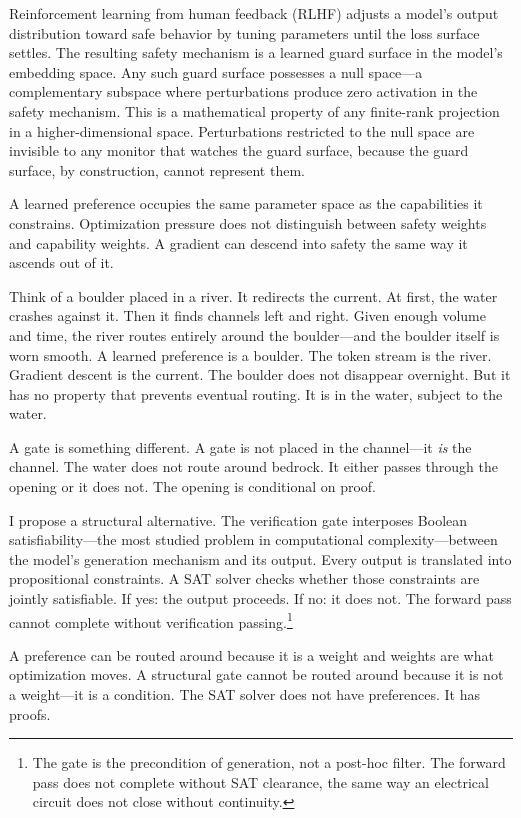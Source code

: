 \documentclass[11pt,a4paper]{article}
\begin{document}
Reinforcement learning from human feedback (RLHF) adjusts a model's output distribution toward safe behavior by tuning parameters until the loss surface settles.
The resulting safety mechanism is a learned guard surface in the model's embedding space.
Any such guard surface possesses a null space---a complementary subspace where perturbations produce zero activation in the safety mechanism.
This is a mathematical property of any finite-rank projection in a higher-dimensional space.
Perturbations restricted to the null space are invisible to any monitor that watches the guard surface, because the guard surface, by construction, cannot represent them.

A learned preference occupies the same parameter space as the capabilities it constrains.
Optimization pressure does not distinguish between safety weights and capability weights.
A gradient can descend into safety the same way it ascends out of it.

Think of a boulder placed in a river.
It redirects the current.
At first, the water crashes against it.
Then it finds channels left and right.
Given enough volume and time, the river routes entirely around the boulder---and the boulder itself is worn smooth.
A learned preference is a boulder.
The token stream is the river.
Gradient descent is the current.
The boulder does not disappear overnight.
But it has no property that prevents eventual routing.
It is in the water, subject to the water.

A gate is something different.
A gate is not placed in the channel---it \textit{is} the channel.
The water does not route around bedrock.
It either passes through the opening or it does not.
The opening is conditional on proof.

I propose a structural alternative.
The verification gate interposes Boolean satisfiability---the most studied problem in computational complexity---between the model's generation mechanism and its output.
Every output is translated into propositional constraints.
A SAT solver checks whether those constraints are jointly satisfiable.
If yes: the output proceeds.
If no: it does not.
The forward pass cannot complete without verification passing.\footnote{The gate is the precondition of generation, not a post-hoc filter. The forward pass does not complete without SAT clearance, the same way an electrical circuit does not close without continuity.}

A preference can be routed around because it is a weight and weights are what optimization moves.
A structural gate cannot be routed around because it is not a weight---it is a condition.
The SAT solver does not have preferences.
It has proofs.
\end{document}
